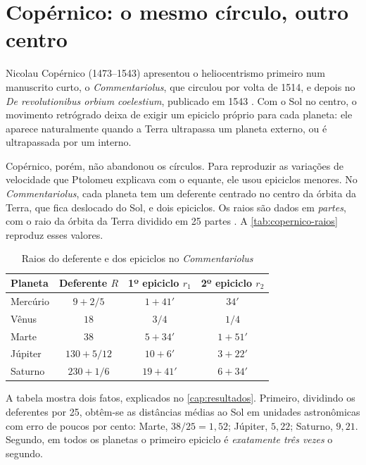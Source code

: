 \section{Copérnico: o mesmo círculo, outro centro}

Nicolau Copérnico (1473--1543) apresentou o heliocentrismo primeiro num manuscrito curto, o \emph{Commentariolus}, que circulou por volta de 1514, e depois no \emph{De revolutionibus orbium coelestium}, publicado em 1543 \cite{martins2003,kuhn2002}. Com o Sol no centro, o movimento retrógrado deixa de exigir um epiciclo próprio para cada planeta: ele aparece naturalmente quando a Terra ultrapassa um planeta externo, ou é ultrapassada por um interno.

Copérnico, porém, não abandonou os círculos. Para reproduzir as variações de velocidade que Ptolomeu explicava com o equante, ele usou epiciclos menores. No \emph{Commentariolus}, cada planeta tem um deferente centrado no centro da órbita da Terra, que fica deslocado do Sol, e dois epiciclos. Os raios são dados em \emph{partes}, com o raio da órbita da Terra dividido em 25 partes \cite{martins2003,farias2016}. A \autoref{tab:copernico-raios} reproduz esses valores.

\begin{table}[htb]
  \centering
  \caption{Raios do deferente e dos epiciclos no \emph{Commentariolus}}
  \label{tab:copernico-raios}
  \begin{tabular}{lccc}
    \toprule
    Planeta & Deferente $R$ & 1º epiciclo $r_1$ & 2º epiciclo $r_2$ \\
    \midrule
    Mercúrio & $9 + 2/5$ & $1 + 41'$ & $34'$ \\
    Vênus    & $18$ & $3/4$ & $1/4$ \\
    Marte    & $38$ & $5 + 34'$ & $1 + 51'$ \\
    Júpiter  & $130 + 5/12$ & $10 + 6'$ & $3 + 22'$ \\
    Saturno  & $230 + 1/6$ & $19 + 41'$ & $6 + 34'$ \\
    \bottomrule
  \end{tabular}
\end{table}

A tabela mostra dois fatos, explicados no \autoref{cap:resultados}. Primeiro, dividindo os deferentes por 25, obtêm-se as distâncias médias ao Sol em unidades astronômicas com erro de poucos por cento: Marte, $38/25 = 1{,}52$; Júpiter, $5{,}22$; Saturno, $9{,}21$. Segundo, em todos os planetas o primeiro epiciclo é \emph{exatamente três vezes} o segundo.

